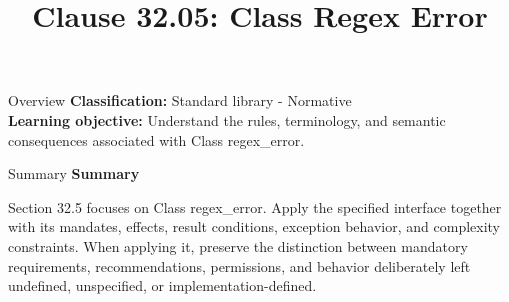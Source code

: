 \documentclass[10pt,letterpaper]{article}
\title{Clause 32.05: Class Regex Error}
\author{}
\date{}
\begin{document}
\maketitle
\begin{CornellOverviewBox}{Overview}
\textbf{Classification:} Standard library - Normative\\[2pt]
\textbf{Learning objective:} Understand the rules, terminology, and semantic consequences associated with Class regex\_error.
\end{CornellOverviewBox}\begin{CornellSummaryBox}{Summary}
{\sffamily\bfseries\color{Accent} Summary}\par\vspace{3pt}Section 32.5 focuses on Class regex\_error. Apply the specified interface together with its mandates, effects, result conditions, exception behavior, and complexity constraints. When applying it, preserve the distinction between mandatory requirements, recommendations, permissions, and behavior deliberately left undefined, unspecified, or implementation-defined.
\end{CornellSummaryBox}
\end{document}
